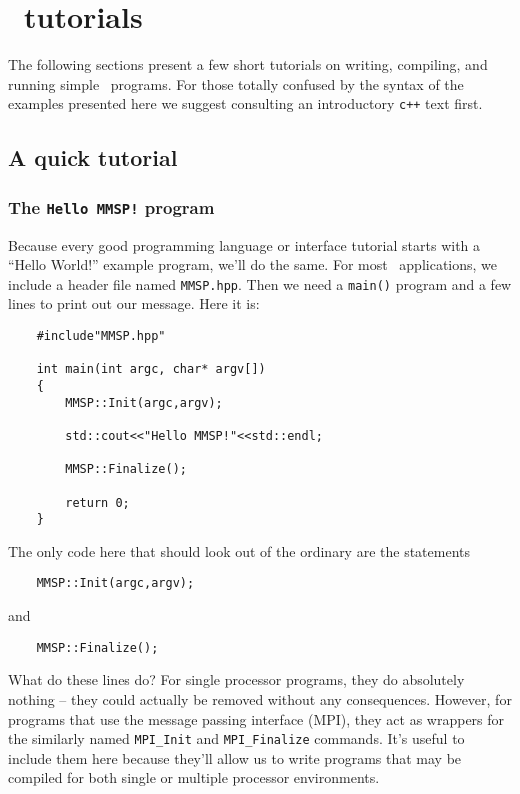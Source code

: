 
\chapter{\MMSP\ tutorials}
The following sections present a few short tutorials on writing, compiling, and running simple \MMSP\ programs.  For those totally confused by the syntax of the examples presented here we suggest consulting an introductory {\tt c++} text first.

\section{A quick tutorial}
\subsection{The {\tt Hello MMSP!} program}
Because every good programming language or interface tutorial starts with a ``Hello World!'' example program, we'll do the same.  For most \MMSP\ applications, we include a header file named {\tt MMSP.hpp}.  Then we need a {\tt main()} program and a few lines to print out our message.  Here it is:
\begin{shadebox}
\begin{verbatim}
    #include"MMSP.hpp"

    int main(int argc, char* argv[])
    {
        MMSP::Init(argc,argv);

        std::cout<<"Hello MMSP!"<<std::endl;

        MMSP::Finalize();
        
        return 0;
    }
\end{verbatim}
\end{shadebox}
The only code here that should look out of the ordinary are the statements
\begin{shadebox}
\begin{verbatim}
    MMSP::Init(argc,argv);
\end{verbatim}
\end{shadebox}
and
\begin{shadebox}
\begin{verbatim}
    MMSP::Finalize();
\end{verbatim}
\end{shadebox}
What do these lines do?  For single processor programs, they do absolutely nothing -- they could actually be removed without any consequences.  However, for programs that use the message passing interface (MPI), they act as wrappers for the similarly named {\tt MPI_Init} and {\tt MPI_Finalize} commands.  It's useful to include them here because they'll allow us to write programs that may be compiled for both single or multiple processor environments.

